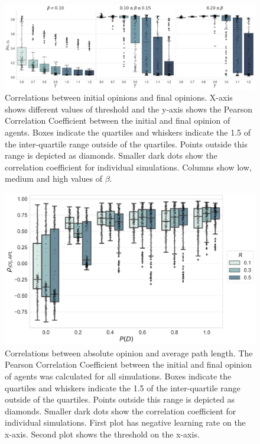 \documentclass{article}
\begin{document}
\begin{figure}[H]
    \centering
    \includegraphics[width=.8\linewidth]{../plots/overall/Correlation_Initial_Opinions.png}
  \caption{Correlations between initial opinions and final opinions. X-axis shows different values of threshold and the y-axis shows the Pearson Correlation Coefficient between the initial and final opinion of agents. Boxes indicate the quartiles and whiskers indicate the 1.5 of the inter-quartile range outside of the quartiles. Points outside this range is depicted as diamonds. Smaller dark dots show the correlation coefficient for individual simulations. Columns show low, medium and high values of $\beta$. }
  \label{fig:corr_initial_final}
\end{figure}

\begin{figure}[H]
    \centering
    \includegraphics[width=.8\linewidth]{../plots/overall/Tie_Dissolution_Correlations_Boxplot_Full.png}
  \caption{Correlations between absolute opinion and average path length. The Pearson Correlation Coefficient between the initial and final opinion of agents was calculated for all simulations. Boxes indicate the quartiles and whiskers indicate the 1.5 of the inter-quartile range outside of the quartiles. Points outside this range is depicted as diamonds. Smaller dark dots show the correlation coefficient for individual simulations. First plot has negative learning rate on the x-axis. Second plot shows the threshold on the x-axis. }
  \label{fig:corr_abs_path}
\end{figure}
\end{document}
